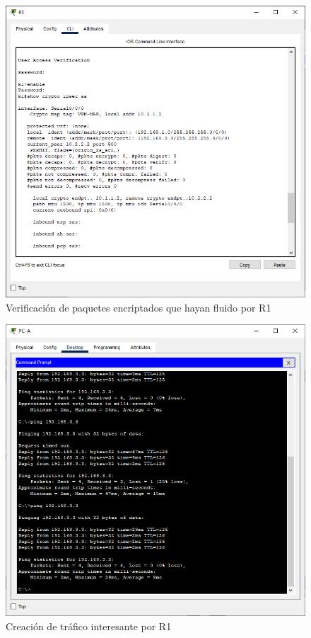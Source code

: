 \documentclass{article}
\begin{document}
        \begin{figure}[!h]
            \centering
            \includegraphics[scale=0.45]{img/task3-step1.png}
            \caption{Verificación de paquetes encriptados que hayan fluido por R1}
            \label{fig:task3-step1}
        \end{figure}

        \clearpage
        \begin{figure}[!h]
            \centering
            \includegraphics[scale=0.45]{img/task3-step2.png}
            \caption{Creación de tráfico interesante por R1}
            \label{fig:task3-step2}
        \end{figure}
\end{document}
